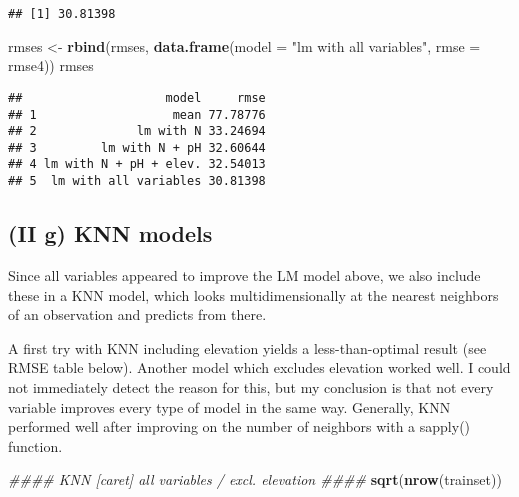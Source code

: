 \documentclass[
]{article}
\newenvironment{Shaded}{\begin{snugshade}}{\end{snugshade}}
\newcommand{\CommentTok}[1]{\textcolor[rgb]{0.56,0.35,0.01}{\textit{#1}}}
\newcommand{\DataTypeTok}[1]{\textcolor[rgb]{0.13,0.29,0.53}{#1}}
\newcommand{\KeywordTok}[1]{\textcolor[rgb]{0.13,0.29,0.53}{\textbf{#1}}}
\newcommand{\NormalTok}[1]{#1}
\newcommand{\OperatorTok}[1]{\textcolor[rgb]{0.81,0.36,0.00}{\textbf{#1}}}
\newcommand{\StringTok}[1]{\textcolor[rgb]{0.31,0.60,0.02}{#1}}
\begin{document}
\begin{Shaded}
\end{Shaded}

\begin{verbatim}
## [1] 30.81398
\end{verbatim}

\begin{Shaded}
\begin{Highlighting}[]
\NormalTok{rmses <{-}}\StringTok{ }\KeywordTok{rbind}\NormalTok{(rmses, }
               \KeywordTok{data.frame}\NormalTok{(}\DataTypeTok{model =} \StringTok{"lm with all variables"}\NormalTok{, }\DataTypeTok{rmse =}\NormalTok{ rmse4))}
\NormalTok{rmses}
\end{Highlighting}
\end{Shaded}

\begin{verbatim}
##                    model     rmse
## 1                   mean 77.78776
## 2              lm with N 33.24694
## 3         lm with N + pH 32.60644
## 4 lm with N + pH + elev. 32.54013
## 5  lm with all variables 30.81398
\end{verbatim}

\newpage

\hypertarget{ii-g-knn-models}{%
\subsection{(II g) KNN models}\label{ii-g-knn-models}}

Since all variables appeared to improve the LM model above, we also
include these in a KNN model, which looks multidimensionally at the
nearest neighbors of an observation and predicts from there.

A first try with KNN including elevation yields a less-than-optimal
result (see RMSE table below). Another model which excludes elevation
worked well. I could not immediately detect the reason for this, but my
conclusion is that not every variable improves every type of model in
the same way. Generally, KNN performed well after improving on the
number of neighbors with a sapply() function.

\begin{Shaded}
\begin{Highlighting}[]
\CommentTok{\#\#\#\# KNN [caret] all variables / excl. elevation \#\#\#\#}
\KeywordTok{sqrt}\NormalTok{(}\KeywordTok{nrow}\NormalTok{(trainset)) }
\end{Highlighting}
\end{Shaded}
\end{document}
